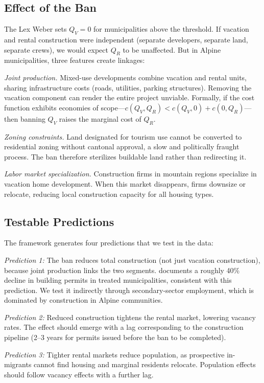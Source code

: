 \documentclass[12pt]{article}
\begin{document}
\subsection{Effect of the Ban}

The Lex Weber sets $Q_V = 0$ for municipalities above the threshold. If vacation and rental construction were independent (separate developers, separate land, separate crews), we would expect $Q_R$ to be unaffected. But in Alpine municipalities, three features create linkages:

\textit{Joint production.} Mixed-use developments combine vacation and rental units, sharing infrastructure costs (roads, utilities, parking structures). Removing the vacation component can render the entire project unviable. Formally, if the cost function exhibits economies of scope---$c(Q_V, Q_R) < c(Q_V, 0) + c(0, Q_R)$---then banning $Q_V$ raises the marginal cost of $Q_R$.

\textit{Zoning constraints.} Land designated for tourism use cannot be converted to residential zoning without cantonal approval, a slow and politically fraught process. The ban therefore sterilizes buildable land rather than redirecting it.

\textit{Labor market specialization.} Construction firms in mountain regions specialize in vacation home development. When this market disappears, firms downsize or relocate, reducing local construction capacity for all housing types.

\subsection{Testable Predictions}

The framework generates four predictions that we test in the data:

\textit{Prediction 1:} The ban reduces total construction (not just vacation construction), because joint production links the two segments. \citet{deville2022restricting} documents a roughly 40\% decline in building permits in treated municipalities, consistent with this prediction. We test it indirectly through secondary-sector employment, which is dominated by construction in Alpine communities.

\textit{Prediction 2:} Reduced construction tightens the rental market, lowering vacancy rates. The effect should emerge with a lag corresponding to the construction pipeline (2--3 years for permits issued before the ban to be completed).

\textit{Prediction 3:} Tighter rental markets reduce population, as prospective in-migrants cannot find housing and marginal residents relocate. Population effects should follow vacancy effects with a further lag.
\end{document}
